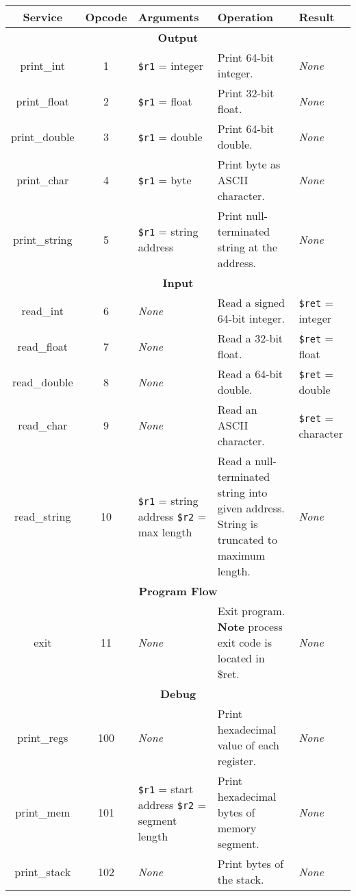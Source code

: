 \documentclass[10pt]{article}
\begin{document}
\bigskip
\begin{longtable}{|c|c|l|l|l|}
    \hline
    \textbf{Service} & \textbf{Opcode} & \textbf{Arguments} & \textbf{Operation} & \textbf{Result} \\
    \hline
    \multicolumn{5}{|c|}{\textbf{Output}} \\
    \hline
    print\_int & 1 & \texttt{\$r1} = integer & Print 64-bit integer. & \textit{None} \\
    \hline
    print\_float & 2 & \texttt{\$r1} = float & Print 32-bit float. & \textit{None} \\
    \hline
    print\_double & 3 & \texttt{\$r1} = double & Print 64-bit double. & \textit{None} \\
    \hline
    print\_char & 4 & \texttt{\$r1} = byte & Print byte as ASCII character. & \textit{None} \\
    \hline
    print\_string & 5 & \texttt{\$r1} = string address & Print null-terminated string at the address. & \textit{None} \\
    \hline \hline
    \multicolumn{5}{|c|}{\textbf{Input}} \\
    \hline
    read\_int & 6 & \textit{None} & Read a signed 64-bit integer. & \texttt{\$ret} = integer \\
    \hline
    read\_float & 7 & \textit{None} & Read a 32-bit float. & \texttt{\$ret} = float \\
    \hline
    read\_double & 8 & \textit{None} & Read a 64-bit double. & \texttt{\$ret} = double \\
    \hline
    read\_char & 9 & \textit{None} & Read an ASCII character. & \texttt{\$ret} = character \\
    \hline
    read\_string & 10 & \makecell[l]{\texttt{\$r1} = string address\\%
    \texttt{\$r2} = max length} & \makecell[l]{Read a null-terminated string into given address.\\%
    String is truncated to maximum length.} & \textit{None} \\
    \hline \hline
    \multicolumn{5}{|c|}{\textbf{Program Flow}} \\
    \hline
    exit & 11 & \textit{None} & \makecell[l]{Exit program.\\%
    \textbf{Note} process exit code is located in \$ret.} & \textit{None} \\
    \hline \hline
    \multicolumn{5}{|c|}{\textbf{Debug}} \\
    \hline
    print\_regs & 100 & \textit{None} & Print hexadecimal value of each register. & \textit{None} \\
    \hline
    print\_mem & 101 & \makecell[l]{\texttt{\$r1} = start address\\%
    \texttt{\$r2} = segment length} & Print hexadecimal bytes of memory segment. & \textit{None} \\
    \hline
    print\_stack & 102 & \textit{None} & Print bytes of the stack. & \textit{None} \\
    \hline
\end{longtable}
\end{document}
